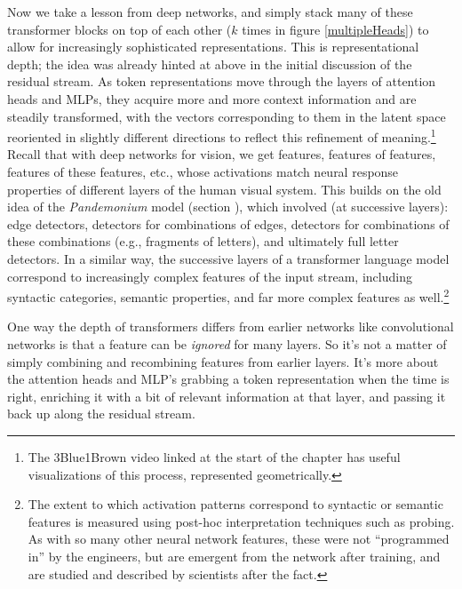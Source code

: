 Now we take a lesson from deep networks, and simply stack many of these
transformer blocks on top of each other ($k$ times in figure
\ref{multipleHeads}) to allow for increasingly sophisticated representations.
This is representational depth; the idea was already hinted at above in the
initial discussion of the residual stream. As token representations move
through the layers of attention heads and MLPs, they acquire more and more
context information and are steadily transformed, with the vectors
corresponding to them in the latent space reoriented in slightly different
directions to reflect this refinement of meaning.\footnote{The 3Blue1Brown
video linked at the start of the chapter has useful visualizations of this
process, represented geometrically.} Recall that with deep networks for vision,
we get features, features of features, features of these features, etc., whose
activations match neural response properties of different layers of the human
visual system. This builds on the old idea of the \emph{Pandemonium} model
(section ), which involved (at successive layers): edge
detectors, detectors for combinations of edges, detectors for combinations of
these combinations (e.g., fragments of letters), and ultimately full letter
detectors. In a similar way, the successive layers of a transformer language
model correspond to increasingly complex features of the input stream,
including syntactic categories, semantic properties, and far more complex
features as well.\footnote{The extent to which activation patterns correspond
to syntactic or semantic features is measured using post-hoc interpretation
techniques such as probing. As with so many other neural network features,
these were not ``programmed in'' by the engineers, but are emergent from the
network after training, and are studied and described by scientists after the
fact.}

One way the depth of transformers differs from earlier networks like convolutional networks is that a feature can be \emph{ignored} for many layers.  So it's not a matter of simply combining and recombining features from earlier layers. It's more about the attention heads and MLP's grabbing a token representation when the time is right, enriching it with a bit of relevant information at that layer, and passing it back up along the residual stream.


